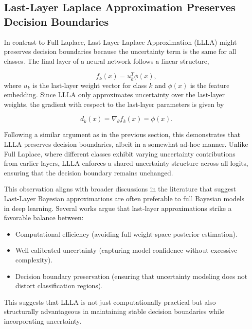 \documentclass{article}
\begin{document}
\subsection{Last-Layer Laplace Approximation Preserves Decision Boundaries}

In contrast to Full Laplace, Last-Layer Laplace Approximation (LLLA) might preserves decision boundaries because the uncertainty term is the same for all classes. The final layer of a neural network follows a linear structure,

\begin{equation}
    f_k(x) = u_k^T \phi(x),
\end{equation}
where \( u_k \) is the last-layer weight vector for class \( k \) and \( \phi(x) \) is the feature embedding. Since LLLA only approximates uncertainty over the last-layer weights, the gradient with respect to the last-layer parameters is given by

\begin{equation}
    d_k(x) = \nabla_{\theta} f_k(x) = \phi(x).
\end{equation}

Following a similar argument as in the previous section, this demonstrates that LLLA preserves decision boundaries, albeit in a somewhat ad-hoc manner. Unlike Full Laplace, where different classes exhibit varying uncertainty contributions from earlier layers, LLLA enforces a shared uncertainty structure across all logits, ensuring that the decision boundary remains unchanged.

This observation aligns with broader discussions in the literature that suggest Last-Layer Bayesian approximations are often preferable to full Bayesian models in deep learning. Several works \cite{ritter2018scalable, kristiadi2020being} argue that last-layer approximations strike a favorable balance between:
\begin{itemize}
    \item Computational efficiency (avoiding full weight-space posterior estimation).
    \item Well-calibrated uncertainty (capturing model confidence without excessive complexity).
    \item Decision boundary preservation (ensuring that uncertainty modeling does not distort classification regions).
\end{itemize}

This suggests that LLLA is not just computationally practical but also structurally advantageous in maintaining stable decision boundaries while incorporating uncertainty.
\end{document}

